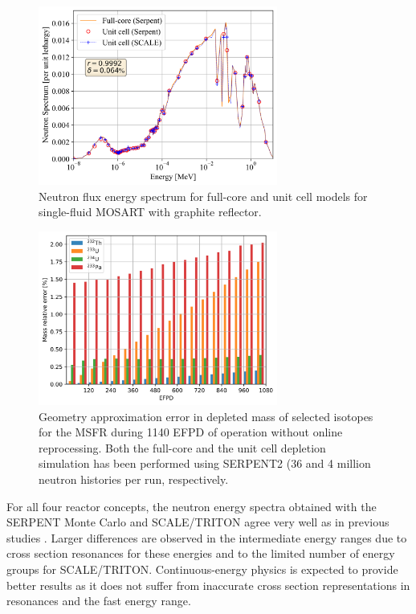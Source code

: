\documentclass[letterpaper]{mandc2019}
\begin{document}
\begin{figure}[!htb]
  \centering
  \includegraphics[width=0.7\textwidth]{./Figures/mosart_full_vs_unit_spectrum.png}
  \caption{Neutron flux energy spectrum for full-core and unit cell models for single-fluid \gls{MOSART} with graphite reflector.}
  \label{fig:spectrum_mosart}
    \vspace{-0.5in}
\end{figure}
\begin{figure}[!htb]
  \centering
  \includegraphics[width=0.7\textwidth]{./Figures/msfr_depl_f_vs_u.png}
  \caption{Geometry approximation error in depleted mass of selected isotopes for the \gls{MSFR} during 1140 EFPD of operation without online reprocessing. Both the full-core and the unit cell depletion simulation has been performed using SERPENT2 (36 and 4 million neutron histories per run, respectively.}
  \label{fig:msfr_depl_err}
    \vspace{-0.5in}
\end{figure}
For all four reactor concepts, the neutron energy spectra obtained with the SERPENT Monte Carlo and SCALE/TRITON agree very well as in previous studies \cite{betzler_fuel_2018}. Larger differences are observed in the intermediate energy ranges due to cross section resonances for these energies and to the limited number of energy groups for SCALE/TRITON. Continuous-energy physics is expected to provide better results as it does not suffer from inaccurate cross section representations in resonances and the fast energy range. 
\end{document}

